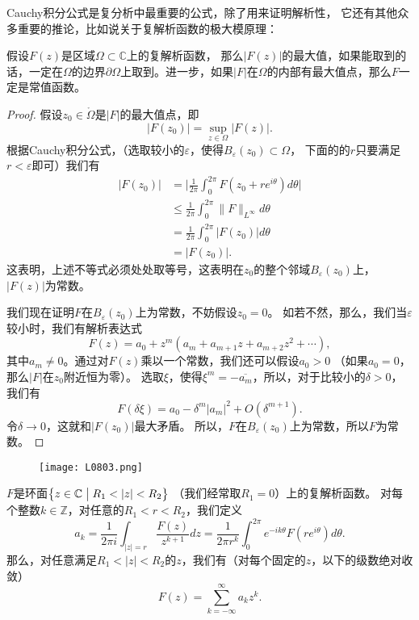 Cauchy积分公式是复分析中最重要的公式，除了用来证明解析性，
它还有其他众多重要的推论，比如说关于复解析函数的极大模原理：
\begin{theorem}[极大模原理]假设$F(z)$是区域$\Omega\subset \mathbb{C}$上的复解析函数，
    那么$|F(z)|$的最大值，如果能取到的话，一定在$\Omega$的边界$\partial \Omega$上取到。进一步，如果$|F|$在$\Omega$的内部有最大值点，那么$F$一定是常值函数。
\end{theorem}
\begin{proof}
假设$z_0\in \mathring{\Omega}$是$|F|$的最大值点，即
\[|F(z_0)|=\sup_{z\in \Omega}|F(z)|.\]
根据Cauchy积分公式，（选取较小的$\varepsilon$，使得$B_\varepsilon(z_0)\subset \Omega$，
下面的的$r$只要满足$r<\varepsilon$即可）我们有
\begin{align*}
|F(z_0)|&=\Big|\frac{1}{2\pi}\int_0^{2\pi}F(z_0+re^{i\theta})d\theta\Big|\\
&\leqslant \frac{1}{2\pi}\int_0^{2\pi}\|F\|_{L^\infty}d\theta\\
&= \frac{1}{2\pi}\int_0^{2\pi} |F(z_0)| d\theta\\
&=|F(z_0)|.
\end{align*}
这表明，上述不等式必须处处取等号，这表明在$z_0$的整个邻域$B_{\varepsilon}(z_0)$上，$|F(z)|$为常数。

我们现在证明$F$在$B_{\varepsilon}(z_0)$上为常数，不妨假设$z_0=0$。
如若不然，那么，我们当$\varepsilon$较小时，我们有解析表达式
\[F(z)=a_0+ z^m(a_m+a_{m+1}z+a_{m+2}z^2+\cdots),\]
其中$a_m\neq 0$。通过对$F(z)$乘以一个常数，我们还可以假设$a_0>0$
（如果$a_0=0$，那么$|F|$在$z_0$附近恒为零）。
选取$\xi$，使得$\xi^m=-\overline{a_m}$，所以，对于比较小的$\delta>0$，我们有
\[F(\delta\xi)=a_0-\delta^m |a_m|^2 +O(\delta^{m+1}).\]
令$\delta\rightarrow 0$，这就和$|F(z_0)|$最大矛盾。
所以，$F$在$B_{\varepsilon}(z_0)$上为常数，所以$F$为常数。
\end{proof}
\begin{figure}[H]
    \centering
    \texttt{[image: L0803.png]}
    \caption{}
\end{figure}
\begin{theorem}[Laurent展开]$F$是环面$\big\{z\in \mathbb{C}\bigm|R_1<|z|<R_2\big\}$ 
    （我们经常取$R_1=0$）上的复解析函数。
    对每个整数$k\in \mathbb{Z}$，对任意的$R_1<r<R_2$，我们定义
\begin{equation*}
a_k=\frac{1}{2\pi i}\int_{|z|=r}\frac{F(z)}{z^{k+1}}dz
=\frac{1}{2\pi r^k}\int_{0}^{2\pi}e^{-ik\theta}F(re^{i\theta})d\theta.
\end{equation*}
那么，对任意满足$R_1<|z|<R_2$的$z$，我们有（对每个固定的$z$，以下的级数绝对收敛）
\begin{equation*}
F(z)=\sum_{k=-\infty}^\infty a_kz^k.
\end{equation*}
\end{theorem}
